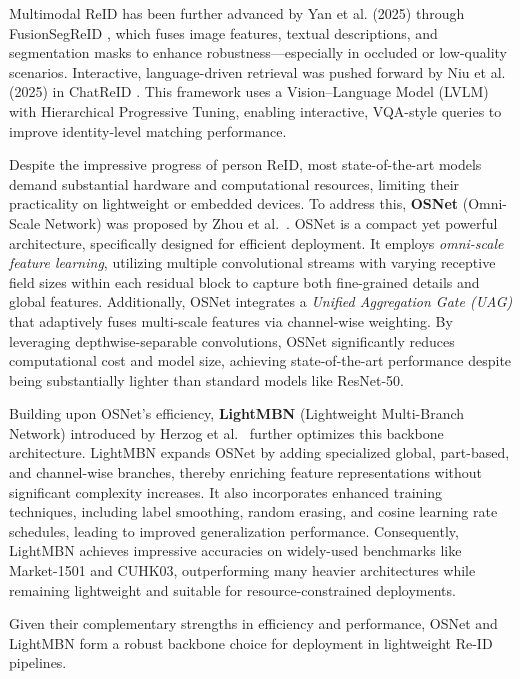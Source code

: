 \documentclass[../main.tex]{subfiles}
\begin{document}
Multimodal ReID has been further advanced by Yan et al. (2025) through \\ FusionSegReID \cite{fusionsegreid}, which fuses image features, textual descriptions, and \\ segmentation masks to enhance robustness—especially in occluded or low-quality scenarios. Interactive, language-driven retrieval was pushed forward by Niu et al. (2025) in ChatReID \cite{chatreid}. This framework uses a Vision–Language Model (LVLM) with Hierarchical Progressive Tuning, enabling interactive, VQA-style queries to improve identity-level matching performance.

Despite the impressive progress of person ReID, most state-of-the-art models demand substantial hardware and computational resources, limiting their practicality on lightweight or embedded devices. To address this, \textbf{OSNet} (Omni-Scale Network) was proposed by Zhou et al.~\cite{zhou2019omniscalefeaturelearningperson}. OSNet is a compact yet powerful architecture, specifically designed for efficient deployment. It employs \textit{omni-scale feature learning}, utilizing multiple convolutional streams with varying receptive field sizes within each residual block to capture both fine-grained details and global features. Additionally, OSNet integrates a \textit{Unified Aggregation Gate (UAG)} that adaptively fuses multi-scale features via channel-wise weighting. By leveraging depthwise-separable convolutions, OSNet significantly reduces computational cost and model size, achieving state-of-the-art performance despite being substantially lighter than standard models like ResNet-50.

Building upon OSNet's efficiency, \textbf{LightMBN} (Lightweight Multi-Branch Network) introduced by Herzog et al.~\cite{Herzog_2021} further optimizes this backbone architecture. LightMBN expands OSNet by adding specialized global, part-based, and channel-wise branches, thereby enriching feature representations without significant complexity increases. It also incorporates enhanced training techniques, including label smoothing, random erasing, and cosine learning rate schedules, leading to improved generalization performance. Consequently, LightMBN achieves impressive accuracies on widely-used benchmarks like Market-1501 and CUHK03, outperforming many heavier architectures while remaining lightweight and suitable for resource-constrained deployments.

Given their complementary strengths in efficiency and performance, OSNet and LightMBN form a robust backbone choice for deployment in lightweight Re-ID pipelines.
\end{document}
